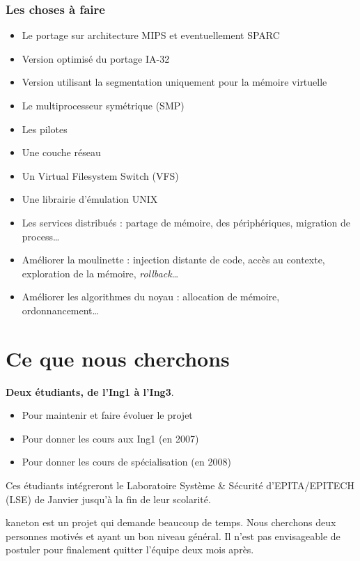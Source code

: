 \begin{frame}
  \frametitle{Les choses \`{a} faire}

  \begin{itemize}
  \item
    Le portage sur architecture MIPS et eventuellement SPARC
  \item
    Version optimis\'{e} du portage IA-32
  \item
    Version utilisant la segmentation uniquement pour la m\'{e}moire virtuelle
  \item
    Le multiprocesseur sym\'{e}trique (SMP)
  \item
    Les pilotes
  \item
    Une couche r\'{e}seau
  \item
    Un Virtual Filesystem Switch (VFS)
  \item
    Une librairie d'\'{e}mulation UNIX
  \item
    Les services distribu\'{e}s : partage de m\'{e}moire, des
    p\'{e}riph\'{e}riques, migration de process\ldots
  \item
    Am\'{e}liorer la moulinette : injection distante de code, acc\`{e}s au
    contexte, exploration de la m\'{e}moire, \emph{rollback}\ldots
  \item
    Am\'{e}liorer les algorithmes du noyau : allocation de
    m\'{e}moire, ordonnancement\ldots
  \end{itemize}

\end{frame}

%
%

\section{Ce que nous cherchons}

\begin{frame}

  \textbf{Deux \'{e}tudiants, de l'Ing1 \`{a} l'Ing3}.

  \begin{itemize}
  \item
    Pour maintenir et faire \'{e}voluer le projet
  \item
    Pour donner les cours aux Ing1 (en 2007)
  \item
    Pour donner les cours de sp\'{e}cialisation (en 2008)
  \end{itemize}

  Ces \'{e}tudiants int\'{e}greront le Laboratoire Syst\`{e}me \& S\'{e}curit\'{e}
  d'EPITA/EPITECH (LSE) de Janvier jusqu'\`{a} la fin de leur scolarit\'{e}.

  \-

  kaneton est un projet qui demande beaucoup de temps. Nous cherchons
  deux personnes motiv\'{e}s et ayant un bon niveau g\'{e}n\'{e}ral. Il n'est pas
  envisageable de postuler pour finalement quitter l'\'{e}quipe deux mois
  apr\`{e}s.

\end{frame}


